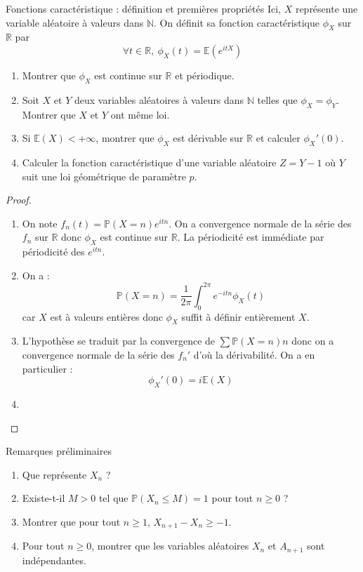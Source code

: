 \documentclass[french,a4paper]{article}
\renewcommand{\P}{\mathbb{P}}
\newcommand{\N}{\mathbb{N}}
\newcommand{\R}{\mathbb{R}}
\newcommand{\E}{\mathbb{E}}
\theoremstyle{plain}
\theoremstyle{definition}
\theoremstyle{remark}
\begin{document}
\begin{ex}[Châteaux]{Fonctions caractéristique : définition et premières propriétés}
	Ici, $X$ représente une variable aléatoire à valeurs dans $\N$. On définit sa fonction caractéristique $\phi_X$ sur $\R$ par $$\forall t\in\R,\ \phi_X(t)=\E(e^{itX})$$
	\begin{enumerate}
		\item Montrer que $\phi_X$ est continue sur $\R$ et périodique.
		\item Soit $X$ et $Y$ deux variables aléatoires à valeurs dans $\N$ telles que $\phi_X=\phi_Y$. Montrer que $X$ et $Y$ ont même loi.
		\item Si $\E(X)<+\infty$, montrer que $\phi_X$ est dérivable sur $\R$ et calculer $\phi_X'(0)$.
		\item Calculer la fonction caractéristique d'une variable aléatoire $Z=Y-1$ où $Y$ suit une loi géométrique de paramètre $p$.
	\end{enumerate}
\end{ex}
\begin{proof}
	\begin{enumerate}
		\item On note $f_n(t)=\P(X=n)e^{itn}$. On a convergence normale de la série des $f_n$ sur $\R$ donc $\phi_X$ est continue sur $\R$. La périodicité est immédiate par périodicité des $e^{itn}$.
		\item On a : $$\P(X=n)=\frac{1}{2\pi}\int_{0}^{2\pi}e^{-itn}\phi_X(t)$$ car $X$ est à valeurs entières donc $\phi_X$ suffit à définir entièrement $X$.
		\item L'hypothèse se traduit par la convergence de $\sum\P(X=n)n$ donc on a convergence normale de la série des $f_n'$ d'où la dérivabilité. On a en particulier : $$\phi_X'(0)=i\E(X)$$
		\item 
	\end{enumerate}
\end{proof}
\begin{ex}[Châteaux]{Remarques préliminaires}
	\begin{enumerate}
		\item Que représente $X_n$ ?
		\item Existe-t-il $M>0$ tel que $\P(X_n\leqslant M)=1$ pour tout $n\geqslant 0$ ?
		\item Montrer que pour tout $n\geqslant 1$, $X_{n+1}-X_n\geqslant -1$.
		\item Pour tout $n\geqslant 0$, montrer que les variables aléatoires $X_n$ et $A_{n+1}$ sont indépendantes.
	\end{enumerate}
\end{ex}
\end{document}
